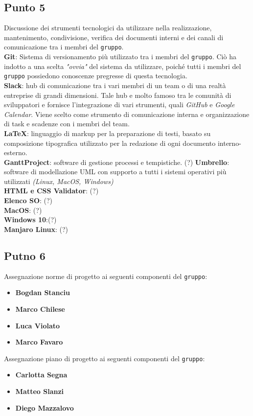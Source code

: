 \subsection{Punto 5}
Discussione dei strumenti tecnologici da utilizzare nella realizzazione, mantenimento, condivisione, verifica dei documenti interni e dei canali di comunicazione tra i membri del \texttt{gruppo}. \\
\textbf{Git}: Sistema di versionamento più utilizzato tra i membri del \texttt{gruppo}. Ciò ha indotto a una scelta \textit{"ovvia"} del sistema da utilizzare, poiché tutti i membri del \texttt{gruppo} possiedono conoscenze pregresse di questa tecnologia. \\ 
\textbf{Slack}: hub di comunicazione tra i vari membri di un team o di una realtà entreprise di grandi dimensioni. Tale hub e molto famoso tra le comunità di sviluppatori e fornisce l'integrazione di vari strumenti, quali \textit{GitHub} e \textit{Google Calendar}. Viene scelto come strumento di comunicazione interna e organizzazione di task e scadenze con i membri del team. \\
\textbf{LaTeX}: linguaggio di markup per la preparazione di testi, basato su  composizione tipografica utilizzato per la redazione di ogni documento interno-esterno.  \\
\textbf{GanttProject}: software di gestione processi e tempistiche. (?) 
\textbf{Umbrello}: software di modellazione UML con supporto a tutti i sistemi operativi più utilizzati \textit{(Linux, MacOS, Windows)} \\
\textbf{HTML e CSS Validator}: (?)\\
\textbf{Elenco SO}: (?) \\ 
\textbf{MacOS}: (?) \\
\textbf{Windows 10}:(?) \\ 
\textbf{Manjaro Linux}: (?)


\subsection{Putno 6}
Assegnazione norme di progetto ai seguenti componenti del \texttt{gruppo}: 
\begin{itemize}
	\item \textbf{Bogdan Stanciu}
	\item \textbf{Marco Chilese}
	\item \textbf{Luca Violato}
	\item \textbf{Marco Favaro}
\end{itemize} 

Assegnazione piano di progetto ai seguenti componenti del \texttt{gruppo}:
\begin{itemize}
	\item \textbf{Carlotta Segna}
	\item \textbf{Matteo Slanzi}
	\item \textbf{Diego Mazzalovo}
\end{itemize}

